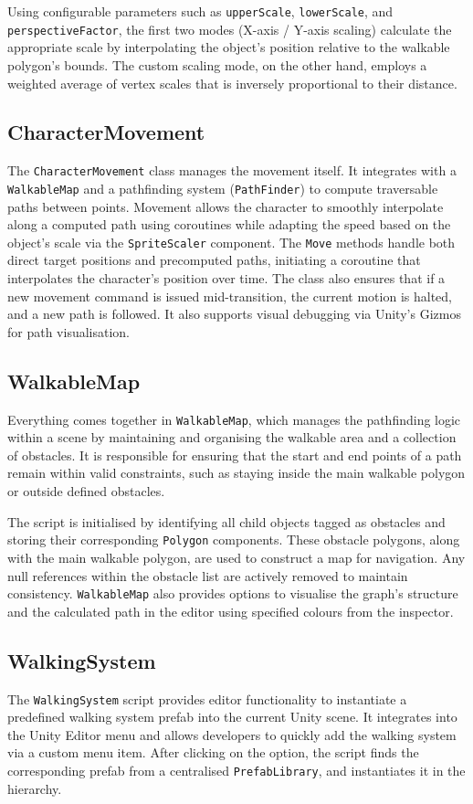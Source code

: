 Using configurable parameters such as \verb|upperScale|, \verb|lowerScale|, and \verb|perspectiveFactor|, the first two modes (X-axis / Y-axis scaling)  calculate the appropriate scale by interpolating the object's position relative to the walkable polygon’s bounds. The custom scaling mode, on the other hand, employs a weighted average of vertex scales that is inversely proportional to their distance. 


\subsection{CharacterMovement}
The \verb|CharacterMovement| class manages the movement itself. It integrates with a \verb|WalkableMap| and a pathfinding system (\verb|PathFinder|) to compute traversable paths between points. Movement allows the character to smoothly interpolate along a computed path using coroutines while adapting the speed based on the object's scale via the \verb|SpriteScaler| component. The \verb|Move| methods handle both direct target positions and precomputed paths, initiating a coroutine that interpolates the character’s position over time. The class also ensures that if a new movement command is issued mid-transition, the current motion is halted, and a new path is followed. It also supports visual debugging via Unity’s Gizmos for path visualisation.

 
\subsection{WalkableMap}
Everything comes together in \verb|WalkableMap|, which manages the pathfinding logic within a scene by maintaining and organising the walkable area and a collection of obstacles. It is responsible for ensuring that the start and end points of a path remain within valid constraints, such as staying inside the main walkable polygon or outside defined obstacles.

The script is initialised by identifying all child objects tagged as obstacles and storing their corresponding \verb|Polygon| components. These obstacle polygons, along with the main walkable polygon, are used to construct a map for navigation. Any null references within the obstacle list are actively removed to maintain consistency. \verb|WalkableMap| also provides options to visualise the graph's structure and the calculated path in the editor using specified colours from the inspector.

\subsection{WalkingSystem}
The \verb|WalkingSystem| script provides editor functionality to instantiate a predefined walking system prefab into the current Unity scene. It integrates into the Unity Editor menu and allows developers to quickly add the walking system via a custom menu item. After clicking on the option, the script finds the corresponding prefab from a centralised \verb|PrefabLibrary|, and instantiates it in the hierarchy.


